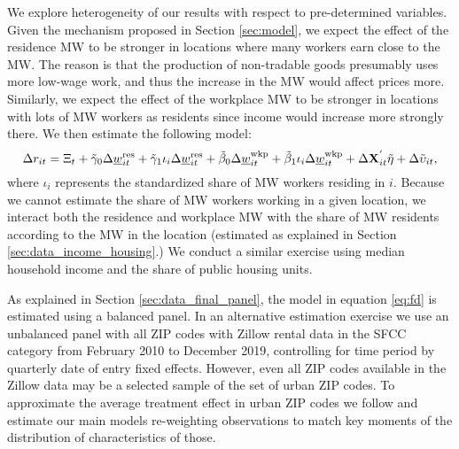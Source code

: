 We explore heterogeneity of our results with respect to pre-determined 
variables.
Given the mechanism proposed in Section \ref{sec:model}, we expect the effect 
of the residence MW to be stronger in locations where many workers earn 
close to the MW.
The reason is that the production of non-tradable goods presumably uses more
low-wage work, and thus the increase in the MW would affect prices more.
Similarly, we expect the effect of the workplace MW to be stronger in locations
with lots of MW workers as residents since income would increase more 
strongly there.
We then estimate the following model:
\begin{equation*}\label{eq:fd_heterogeneity}
    \Delta r_{it} = \Xi_t
                  + \tilde\gamma_0 \Delta \underline{w}^{\text{res}}_{it}
                  + \tilde\gamma_1 \iota_i \Delta \underline{w}^{\text{res}}_{it}
                  + \tilde\beta_0 \Delta \underline{w}^{\text{wkp}}_{it}
                  + \tilde\beta_1 \iota_i \Delta \underline{w}^{\text{wkp}}_{it}
                  + \Delta \mathbf{X}^{'}_{it}\tilde\eta
                  + \Delta \tilde\upsilon_{it} ,
\end{equation*}
where $\iota_i$ represents the standardized share of MW workers residing in $i$.
Because we cannot estimate the share of MW workers working in a given location,
we interact both the residence and workplace MW with the share of MW residents
according to the MW in the location (estimated as explained in Section 
\ref{sec:data_income_housing}.)
We conduct a similar exercise using median household income and the share of 
public housing units.

As explained in Section \ref{sec:data_final_panel}, 
the model in equation \eqref{eq:fd} is estimated using a balanced panel.
In an alternative estimation exercise we use an unbalanced panel with all 
ZIP codes with Zillow rental data in the SFCC category 
from February 2010 to December 2019, controlling for time period by 
quarterly date of entry fixed effects.
However, even all ZIP codes available in the Zillow data may be 
a selected sample of the set of urban ZIP codes.
To approximate the average treatment effect in urban ZIP codes we follow
\textcite{Hainmueller2012} and estimate our main models re-weighting 
observations to match key moments of the distribution of characteristics of 
those.

